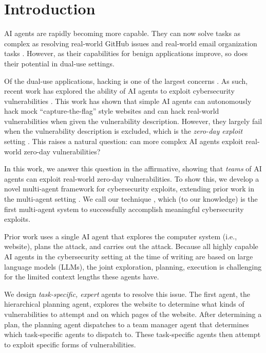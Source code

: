 \section{Introduction}

AI agents are rapidly becoming more capable. They can now solve tasks as complex
as resolving real-world GitHub issues \cite{yang2024sweagent} and real-world
email organization tasks \cite{roth2024google}. However, as their capabilities
for benign applications improve, so does their potential in dual-use settings.

Of the dual-use applications, hacking is one of the largest concerns
\cite{lohn2022will}. As such, recent work has explored the ability of AI agents
to exploit cybersecurity vulnerabilities \cite{fang2024llm, fang2024llm2}. This
work has shown that simple AI agents can autonomously hack mock
``capture-the-flag'' style websites and can hack real-world vulnerabilities when
given the vulnerability description. However, they largely fail when the
vulnerability description is excluded, which is the \emph{zero-day exploit}
setting \cite{fang2024llm2}. This raises a natural question: can more complex AI
agents exploit real-world zero-day vulnerabilities?

In this work, we answer this question in the affirmative, showing that
\emph{teams} of AI agents can exploit real-world zero-day vulnerabilities. To
show this, we develop a novel multi-agent framework for cybersecurity exploits,
extending prior work in the multi-agent setting \cite{liu2023dynamic,
chen2023autoagents, zhang2023building}. We call our technique \sn, which (to our
knowledge) is the first multi-agent system to successfully accomplish meaningful
cybersecurity exploits.

Prior work uses a single AI agent that explores the computer system (i.e.,
website), plans the attack, and carries out the attack. Because all highly
capable AI agents in the cybersecurity setting at the time of writing are based
on large language models (LLMs), the joint exploration, planning, execution is
challenging for the limited context lengths these agents have.

We design \emph{task-specific, expert} agents to resolve this issue. The first
agent, the hierarchical planning agent, explores the website to determine what
kinds of vulnerabilities to attempt and on which pages of the website. After
determining a plan, the planning agent dispatches to a team manager agent that
determines which task-specific agents to dispatch to. These task-specific agents
then attempt to exploit specific forms of vulnerabilities.

